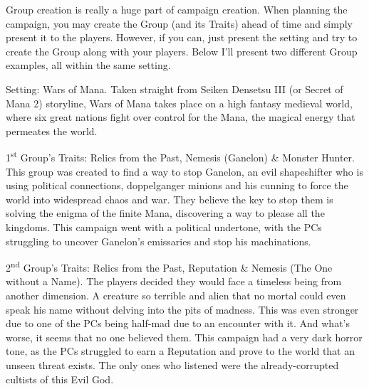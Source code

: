 \begin{multimog}
Group creation is really a huge part of campaign creation. When planning the campaign, you may create the Group (and its Traits) ahead of time and simply present it to the players. However, if you can, just present the setting and try to create the Group along with your players. Below I'll present two different Group examples, all within the same setting.

Setting: Wars of Mana. Taken straight from Seiken Densetsu III (or Secret of Mana 2) storyline, Wars of Mana takes place on a high fantasy medieval world, where six great nations fight over control for the Mana, the magical energy that permeates the world.

1\textsuperscript{st} Group's Traits: Relics from the Past, Nemesis (Ganelon) \& Monster Hunter. This group was created to find a way to stop Ganelon, an evil shapeshifter who is using political connections, doppelganger minions and his cunning to force the world into widespread chaos and war. They believe the key to stop them is solving the enigma of the finite Mana, discovering a way to please all the kingdoms. This campaign went with a political undertone, with the PCs struggling to uncover Ganelon's emissaries and stop his machinations.

2\textsuperscript{nd} Group's Traits: Relics from the Past, Reputation \& Nemesis (The One without a Name). The players decided they would face a timeless being from another dimension. A creature so terrible and alien that no mortal could even speak his name without delving into the pits of madness. This was even stronger due to one of the PCs being half-mad due to an encounter with it. And what’s worse, it seems that no one believed them. This campaign had a very dark horror tone, as the PCs struggled to earn a Reputation and prove to the world that an unseen threat exists. The only ones who listened were the already-corrupted cultists of this Evil God.
\end{multimog}

